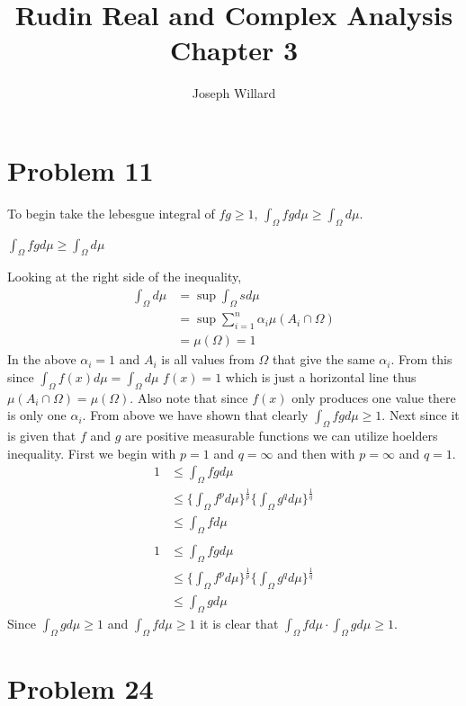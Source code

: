 \documentclass[12pt]{article}
\title{Rudin Real and Complex Analysis Chapter 3}
\author{Joseph Willard}
\begin{document}
\maketitle

\section*{Problem 11}
To begin take the lebesgue integral of $fg \geq 1$, $\int_{\Omega}fgd\mu
\geq \int_{\Omega}d\mu$.
\begin{center}
$\int_{\Omega}fg d\mu \geq \int_{\Omega}d\mu$
\end{center}
Looking at the right side of the inequality,
\begin{align*}
\int_{\Omega}d\mu &= \sup \int_{\Omega}s d\mu\\  
&= \sup \sum_{i = 1}^{n}\alpha_{i}\mu (A_{i} \cap \Omega)\\
&= \mu(\Omega) = 1
\end{align*}
In the above $\alpha_{i} = 1$ and $A_{i}$ is all values from $\Omega$
that give the same $\alpha_{i}$. From this since
$\int_{\Omega}f(x)d\mu = \int_{\Omega}d\mu$ $f(x)=1$ which is just a
horizontal line thus $\mu (A_{i} \cap \Omega) = \mu(\Omega)$. Also
note that since $f(x)$ only produces one value there is only one
$\alpha_{i}$. From above we have shown that clearly
$\int_{\Omega}fgd\mu \geq 1$. Next since it is given that $f$ and $g$
are positive measurable functions we can utilize hoelders
inequality. First we begin with $p=1$ and $q=\infty$ and then with $p=\infty$ and $q = 1$.
\begin{align*}
1 &\leq \int_{\Omega}fg d\mu\\
  & \leq \Big \{ \int_{\Omega}f^{p}d\mu \Big \}^{\frac{1}{p}}\Big \{ \int_{\Omega}g^{q}d\mu \Big \}^{\frac{1}{q}}\\
  &\leq \int_{\Omega}f d\mu\\
\end{align*}
\begin{align*}
  1 &\leq \int_{\Omega}fg d\mu\\
  & \leq \Big \{ \int_{\Omega}f^{p}d\mu \Big \}^{\frac{1}{p}}\Big \{ \int_{\Omega}g^{q}d\mu \Big \}^{\frac{1}{q}}\\
  &\leq \int_{\Omega}g d\mu
\end{align*}
Since $\int_{\Omega}g d\mu \geq 1$ and $\int_{\Omega}f d\mu \geq 1$ it
is clear that $\int_{\Omega}f d\mu \cdot \int_{\Omega}g d\mu \geq 1$.


\section*{Problem 24}
\end{document}
